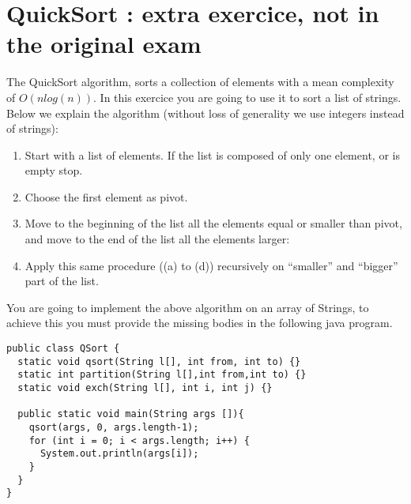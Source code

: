 \documentclass[correction]{exercices}
\begin{document}
\pagebreak
\section{QuickSort :  extra exercice, not in the original exam}

The QuickSort algorithm, sorts a collection of elements with
a mean complexity of $O(nlog(n))$. In this exercice you are going to
use it to sort a list of strings. Below we explain the algorithm
(without loss of generality we use integers instead of strings):
\begin{enumerate}
\item Start with a list of elements.
  If the list is composed of only one element, or is empty stop.\\
\item Choose the first element as pivot.\\
\item Move to the beginning of the list all the elements equal or smaller than pivot, and move to the end of the list  all the elements larger:\\
\item Apply this same procedure ((a) to (d)) recursively on ``smaller''
  and ``bigger'' part of the list.
\end{enumerate}


You are going to implement the above algorithm on an array of
Strings, to achieve this you must provide the missing bodies
in the following java program.
\begin{verbatim}
public class QSort {
  static void qsort(String l[], int from, int to) {}
  static int partition(String l[],int from,int to) {}
  static void exch(String l[], int i, int j) {}

  public static void main(String args []){
    qsort(args, 0, args.length-1);
    for (int i = 0; i < args.length; i++) {
      System.out.println(args[i]);
    }
  }
}
\end{verbatim}
\end{document}
